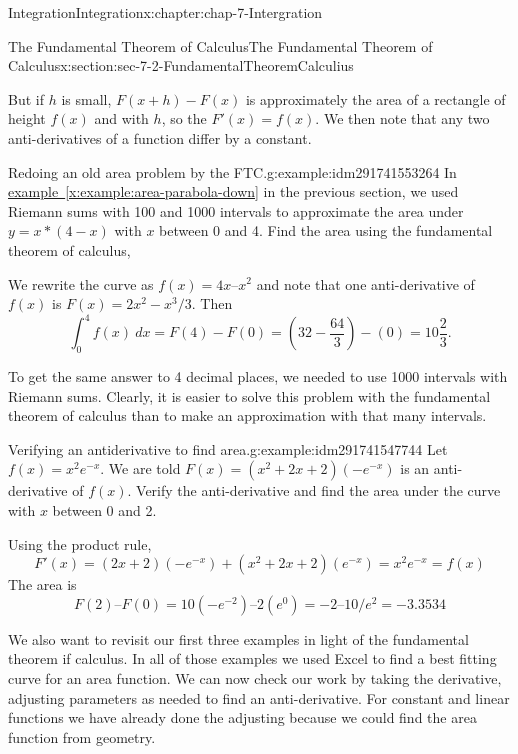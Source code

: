 \documentclass[oneside,10pt,]{book}
\numberwithin{equation}{section}
\begin{document}
\begin{chapterptx}{Integration}{}{Integration}{}{}{x:chapter:chap-7-Intergration}
\begin{sectionptx}{The Fundamental Theorem of Calculus}{}{The Fundamental Theorem of Calculus}{}{}{x:section:sec-7-2-FundamentalTheoremCalculius}
\begin{sidebyside}{1}{0.15}{0.15}{0}
\begin{sbspanel}{0.7}
\end{sbspanel}%
\end{sidebyside}%
\par
But if \(h\) is small, \(F(x+h)-F(x)\) is approximately the area of a rectangle of height \(f(x)\) and with \(h\), so the \(F'(x) = f(x)\).  We then note that any two anti-derivatives of a function differ by a constant.%
\begin{example}{Redoing an old area problem by the  FTC.}{g:example:idm291741553264}%
In \hyperref[x:example:area-parabola-down]{example~\ref{x:example:area-parabola-down}} in the previous section, we used Riemann sums with 100 and 1000 intervals to approximate the area under \(y = x*(4-x)\) with \(x\) between 0 and 4.  Find the area using the fundamental theorem of calculus,%
\par
We rewrite the curve as \(f(x) = 4x – x^2\) and note that one anti-derivative of \(f(x)\) is \(F(x) = 2 x^2 - x^3/3\).  Then%
%
\begin{equation*}
\int_0^4 f(x)\ dx=F(4)-F(0)=\left(32-\frac{64}{3}\right)-(0)=10 \frac{2}{3}.
\end{equation*}
\end{example}
To get the same answer to 4 decimal places, we needed to use 1000 intervals with Riemann sums.  Clearly, it is easier to solve this problem with the fundamental theorem of calculus than to make an approximation with that many intervals.%
\begin{example}{Verifying an antiderivative to find area.}{g:example:idm291741547744}%
Let \(f(x)=x^2 e^{-x}\).  We are told \(F(x)=(x^2+2 x+2) (-e^{-x})\)  is an anti-derivative of \(f(x)\).  Verify the anti-derivative and find the area under the curve with \(x\) between 0 and 2.%
\par
Using the product rule,%
%
\begin{equation*}
F'(x)=(2x+2) (-e^{-x}) + (x^2+2x+2) (e^{-x})=x^2 e^{-x}=f(x)
\end{equation*}
The area is%
%
\begin{equation*}
F(2) – F(0) = 10(-e^{-2}) – 2(e^{0}) = -2 – 10/e^2 = -3.3534
\end{equation*}
\end{example}
We also want to revisit our first three examples in light of the fundamental theorem if calculus.  In all of those examples we used Excel to find a best fitting curve for an area function.  We can now check our work by taking the derivative, adjusting parameters as needed to find an anti-derivative.  For constant and linear functions we have already done the adjusting because we could find the area function from geometry.%

\end{sectionptx}
\end{chapterptx}
\end{document}
